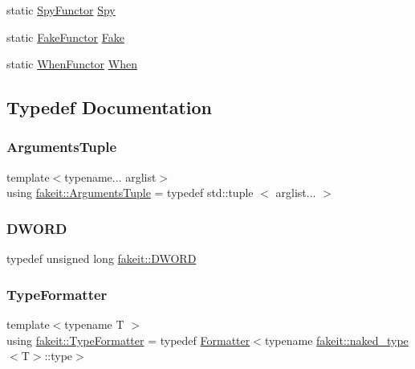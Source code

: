 \begin{DoxyCompactItemize}
\item 
static \mbox{\hyperlink{classfakeit_1_1SpyFunctor}{Spy\+Functor}} \mbox{\hyperlink{namespacefakeit_a540f23d3c59c17f86dd99f0a8d845496}{Spy}}
\item 
static \mbox{\hyperlink{classfakeit_1_1FakeFunctor}{Fake\+Functor}} \mbox{\hyperlink{namespacefakeit_a8162a4e2e05662a6ce810ae0b9a7f89e}{Fake}}
\item 
static \mbox{\hyperlink{classfakeit_1_1WhenFunctor}{When\+Functor}} \mbox{\hyperlink{namespacefakeit_ac9c6dd7971865edcc46e075d6408b1bb}{When}}
\end{DoxyCompactItemize}


\subsection{Typedef Documentation}
\mbox{\label{namespacefakeit_a476a37a598825e1b5dd67b3a176491a1}} 
\subsubsection{\texorpdfstring{ArgumentsTuple}{ArgumentsTuple}}
{\footnotesize\ttfamily template$<$typename... arglist$>$ \\
using \mbox{\hyperlink{namespacefakeit_a476a37a598825e1b5dd67b3a176491a1}{fakeit\+::\+Arguments\+Tuple}} = typedef std\+::tuple $<$ arglist... $>$}

\mbox{\label{namespacefakeit_a3d9fcff73186d3a22472ec6156db1f10}} 
\subsubsection{\texorpdfstring{DWORD}{DWORD}}
{\footnotesize\ttfamily typedef unsigned long \mbox{\hyperlink{namespacefakeit_a3d9fcff73186d3a22472ec6156db1f10}{fakeit\+::\+D\+W\+O\+RD}}}

\mbox{\label{namespacefakeit_a61cf34d779d6e6933029ae3127e05fd4}} 
\subsubsection{\texorpdfstring{TypeFormatter}{TypeFormatter}}
{\footnotesize\ttfamily template$<$typename T $>$ \\
using \mbox{\hyperlink{namespacefakeit_a61cf34d779d6e6933029ae3127e05fd4}{fakeit\+::\+Type\+Formatter}} = typedef \mbox{\hyperlink{structfakeit_1_1Formatter}{Formatter}}$<$typename \mbox{\hyperlink{structfakeit_1_1naked__type}{fakeit\+::naked\+\_\+type}}$<$T$>$\+::type$>$}



